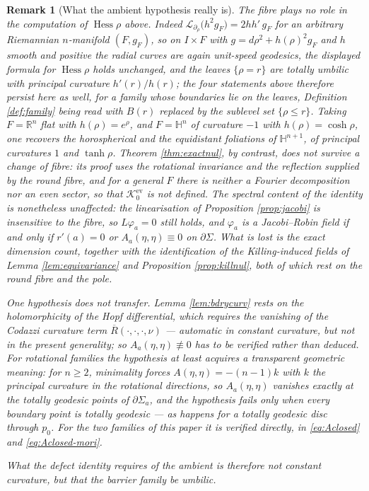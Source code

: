 \documentclass[10pt,a4paper]{amsart}
\newtheorem{remark}[theorem]{Remark}
\newcommand{\R}{\mathbb{R}}
\newcommand{\Hyp}{\mathbb{H}}
\newcommand{\Hess}{\operatorname{Hess}}
\newcommand{\Ker}{\mathcal{K}}
\begin{document}
\begin{remark}[What the ambient hypothesis really is]
The fibre plays no role in the computation of $\Hess\rho$ above. Indeed $\mathcal L_{\partial_\rho}\bigl(h^{2}g_{F}\bigr)=2hh'\,g_{F}$ for an arbitrary Riemannian $n$-manifold $(F,g_{F})$, so on $I\times F$ with $g=d\rho^{2}+h(\rho)^{2}g_{F}$ and $h$ smooth and positive the radial curves are again unit-speed geodesics, the displayed formula for $\Hess\rho$ holds
unchanged, and the leaves $\{\rho=r\}$ are totally umbilic with principal curvature $h'(r)/h(r)$; the four statements above therefore persist here as well, for a family whose boundaries lie on the leaves, Definition \ref{def:family} being read with $B(r)$ replaced by the sublevel set
$\{\rho\le r\}$. Taking $F=\R^{n}$ flat with $h(\rho)=e^{\rho}$, and $F=\Hyp^{n}$ of curvature $-1$ with $h(\rho)=\cosh\rho$, one recovers the horospherical and the equidistant foliations of $\Hyp^{n+1}$, of principal curvatures $1$ and $\tanh\rho$. Theorem \ref{thm:exactnul}, by contrast, does not survive a change of fibre: its proof uses the rotational invariance and the reflection supplied by the round fibre, and for a general $F$ there is neither a Fourier decomposition nor an even sector, so that $\Ker_0^{\mathrm{ev}}$ is not defined. The spectral content of the identity is nonetheless unaffected: the linearisation of Proposition \ref{prop:jacobi} is insensitive to the fibre, so $L\varphi_a=0$ still holds, and $\varphi_a$ is a Jacobi--Robin field if and only if $r'(a)=0$ or $A_a(\eta,\eta)\equiv 0$ on $\partial\Sigma$. What is lost is the exact dimension count, together with the identification of the Killing-induced fields of Lemma \ref{lem:equivariance} and Proposition \ref{prop:killnul}, both of which rest on the round fibre and the pole.

One hypothesis does not transfer. Lemma  \ref{lem:bdrycurv} rests on the holomorphicity of the Hopf differential, which requires the vanishing of the Codazzi curvature term $\overline R(\cdot,\cdot,\cdot,\nu)$ --- automatic in constant curvature, but not in the present generality; so $A_a(\eta,\eta)\not\equiv 0$ has to be verified rather than deduced. For rotational families the hypothesis at least acquires a transparent geometric meaning: for $n\geq 2$, minimality forces $A(\eta,\eta)=-(n-1)k$ with $k$ the principal curvature in the rotational directions, so $A_a(\eta,\eta)$ vanishes exactly at the totally geodesic points of $\partial\Sigma_a$, and the hypothesis fails only when every boundary point is totally geodesic --- as happens for a totally geodesic disc through $p_0$. For the two families of this paper it is verified directly, in \eqref{eq:Aclosed} and \eqref{eq:Aclosed-mori}.

What the defect identity requires of the ambient is therefore not constant curvature, but that the barrier family be umbilic.
\end{remark}
\end{document}
